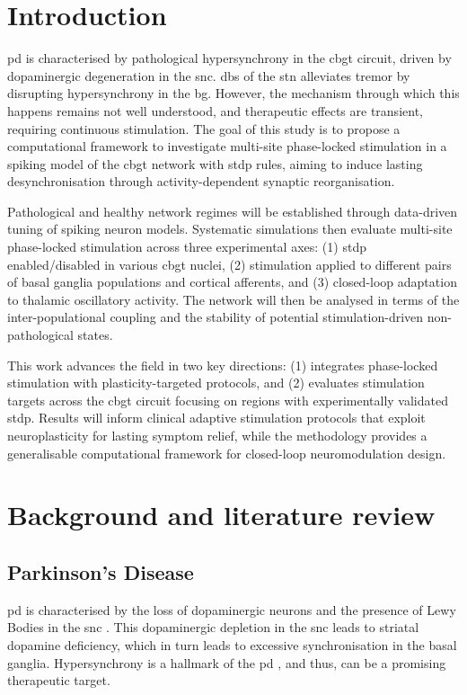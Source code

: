 \newpage
{}
\setcounter{page}{1}

\section{Introduction}
\acrfull{pd} is characterised by pathological hypersynchrony in the \acrfull{cbgt} circuit, driven by
dopaminergic degeneration in the \acrfull{snc}.
\acrlong{dbs} of the \acrfull{stn} alleviates tremor by disrupting
hypersynchrony in the \acrfull{bg}.
However, the mechanism through which this happens remains not well understood, and therapeutic effects are transient,
requiring continuous stimulation.
The goal of this study is to propose a computational framework to investigate multi-site phase-locked stimulation in a
spiking model of the \acrshort{cbgt} network with \acrfull{stdp} rules, aiming to induce lasting desynchronisation
through activity-dependent synaptic reorganisation.

Pathological and healthy network regimes will be established through data-driven tuning of spiking
neuron models.
Systematic simulations then evaluate multi-site phase-locked stimulation across three experimental axes:
(1) \acrshort{stdp} enabled/disabled in various \acrshort{cbgt} nuclei,
(2) stimulation applied to different pairs of basal ganglia populations and cortical afferents, and
(3) closed-loop adaptation to thalamic oscillatory activity.
The network will then be analysed in terms of the inter-populational coupling and the stability of potential
stimulation-driven non-pathological states.

This work advances the field in two key directions:
(1) integrates phase-locked stimulation with plasticity-targeted protocols, and
(2) evaluates stimulation targets across the \acrshort{cbgt} circuit focusing on regions with experimentally validated \acrshort{stdp}.
Results will inform clinical adaptive stimulation protocols that exploit neuroplasticity for lasting symptom relief,
while the methodology provides a generalisable computational framework for closed-loop neuromodulation design.

\section{Background and literature review}

\subsection{Parkinson's Disease}
\acrshort{pd} is characterised by the loss of dopaminergic neurons and the presence of
Lewy Bodies in the \acrshort{snc} \cite{del2018advances}. This dopaminergic depletion in the \acrshort{snc} leads to striatal dopamine
deficiency, which in turn leads to excessive synchronisation in the basal ganglia.
Hypersynchrony is a hallmark of the \acrshort{pd} \cite{hammond2007pathological, helmich2012cerebral},
and thus, can be a promising therapeutic target.


